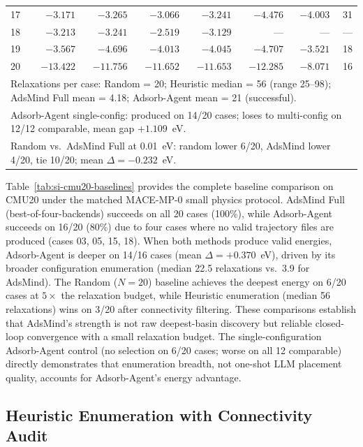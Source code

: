 \documentclass[%
 preprint,
 superscriptaddress,
 amsmath,amssymb,
 aps,
 prb,
 floatfix,
]{revtex4-2}
\begin{document}
\begin{table}[ht]
{\begin{tabular}{lrrrrrrr}
17 & $-3.171$ & $-3.265$ & $-3.066$ & $-3.241$ & $-4.476$ & $-4.003$ & 31 \\
18 & $-3.213$ & $-3.241$ & $-2.519$ & $-3.129$ & --- & --- & --- \\
19 & $-3.567$ & $-4.696$ & $-4.013$ & $-4.045$ & $-4.707$ & $-3.521$ & 18 \\
20 & $-13.422$ & $-11.756$ & $-11.652$ & $-11.653$ & $-12.285$ & $-8.071$ & 16 \\
\midrule
\multicolumn{8}{l}{Relaxations per case: Random = 20; Heuristic median = 56 (range 25--98); AdsMind Full mean = 4.18; Adsorb-Agent mean = 21 (successful).} \\
\multicolumn{8}{l}{Adsorb-Agent single-config: produced on 14/20 cases; loses to multi-config on 12/12 comparable, mean gap $+1.109$~eV.} \\
\multicolumn{8}{l}{Random vs.\ AdsMind Full at 0.01~eV: random lower 6/20, AdsMind lower 4/20, tie 10/20; mean $\Delta = -0.232$~eV.} \\
\bottomrule
\end{tabular}%
}
\end{table}

Table~\ref{tab:si-cmu20-baselines} provides the complete baseline comparison on CMU20 under the matched MACE-MP-0 small physics protocol. AdsMind Full (best-of-four-backends) succeeds on all 20 cases (100\%), while Adsorb-Agent succeeds on 16/20 (80\%) due to four cases where no valid trajectory files are produced (cases 03, 05, 15, 18). When both methods produce valid energies, Adsorb-Agent is deeper on 14/16 cases (mean $\Delta = +0.370$~eV), driven by its broader configuration enumeration (median 22.5 relaxations vs.\ 3.9 for AdsMind). The Random ($N=20$) baseline achieves the deepest energy on 6/20 cases at $5\times$ the relaxation budget, while Heuristic enumeration (median 56 relaxations) wins on 3/20 after connectivity filtering. These comparisons establish that AdsMind's strength is not raw deepest-basin discovery but reliable closed-loop convergence with a small relaxation budget. The single-configuration Adsorb-Agent control (no selection on 6/20 cases; worse on all 12 comparable) directly demonstrates that enumeration breadth, not one-shot LLM placement quality, accounts for Adsorb-Agent's energy advantage.

\subsection{Heuristic Enumeration with Connectivity Audit}
\end{document}
